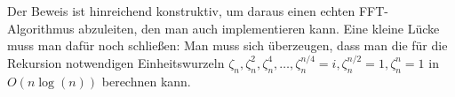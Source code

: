 \begin{remark}
    Der Beweis ist hinreichend konstruktiv, um daraus einen echten FFT-Algorithmus abzuleiten, den man auch implementieren kann.
    \medskip
    Eine kleine Lücke muss man dafür noch schließen: Man muss sich überzeugen, dass man die für die Rekursion notwendigen Einheitswurzeln $\zeta_n, \zeta_n^2, \zeta_n^4, \ldots, \zeta_n^{n/4} = i, \zeta_n^{n/2}=1, \zeta_n^n=1$ in $O(n\log(n))$ berechnen kann.
\end{remark}